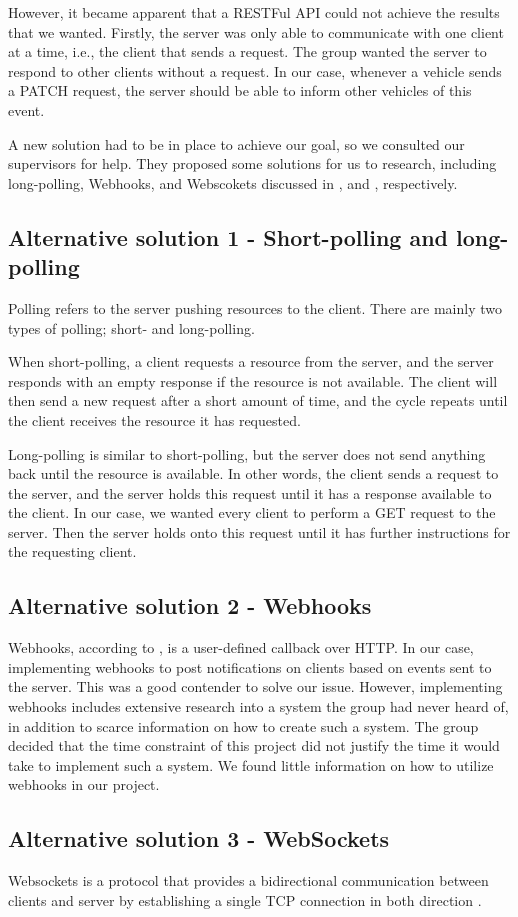 However, it became apparent that a RESTFul API could not achieve the results that we wanted. Firstly, the server was only able to communicate with one client at a time, i.e., the client that sends a request. The group wanted the server to respond to other clients without a request. In our case, whenever a vehicle sends a PATCH request, the server should be able to inform other vehicles of this event.

A new solution had to be in place to achieve our goal, so we consulted our supervisors for help. They proposed some solutions for us to research, including long-polling, Webhooks, and Webscokets discussed in ,  and , respectively.

\subsection{Alternative solution 1 - Short-polling and long-polling}\label{longpolling}
Polling refers to the server pushing resources to the client. There are mainly two types of polling; short- and long-polling. 

When short-polling, a client requests a resource from the server, and the server responds with an empty response if the resource is not available. The client will then send a new request after a short amount of time, and the cycle repeats until the client receives the resource it has requested.

Long-polling is similar to short-polling, but the server does not send anything back until the resource is available. In other words, the client sends a request to the server, and the server holds this request until it has a response available to the client. In our case, we wanted every client to perform a GET request to the server. Then the server holds onto this request until it has further instructions for the requesting client.

\subsection{Alternative solution 2 - Webhooks}\label{webhooks}
Webhooks, according to \cite{webhooks}, is a user-defined callback over HTTP. In our case, implementing webhooks to post notifications on clients based on events sent to the server. This was a good contender to solve our issue. However, implementing webhooks includes extensive research into a system the group had never heard of, in addition to scarce information on how to create such a system. The group decided that the time constraint of this project did not justify the time it would take to implement such a system. We found little information on how to utilize webhooks in our project.                                                                                                                                                                                                                       

\subsection{Alternative solution 3 - WebSockets}\label{websockets}
Websockets is a protocol that provides a bidirectional communication between clients and server by establishing a single TCP connection in both direction \parencite{rfc_websockets}.  
